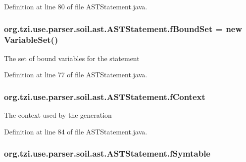 Definition at line 80 of file A\-S\-T\-Statement.\-java.

\hypertarget{classorg_1_1tzi_1_1use_1_1parser_1_1soil_1_1ast_1_1_a_s_t_statement_a9f4ac22b545acfcaf1cd6cb2c22b6ab0}{
\subsubsection[{f\-Bound\-Set}]{ org.\-tzi.\-use.\-parser.\-soil.\-ast.\-A\-S\-T\-Statement.\-f\-Bound\-Set = new {\bf Variable\-Set}()\hspace{0.3cm}{\ttfamily [protected]}}}\label{classorg_1_1tzi_1_1use_1_1parser_1_1soil_1_1ast_1_1_a_s_t_statement_a9f4ac22b545acfcaf1cd6cb2c22b6ab0}
The set of bound variables for the statement 

Definition at line 77 of file A\-S\-T\-Statement.\-java.

\hypertarget{classorg_1_1tzi_1_1use_1_1parser_1_1soil_1_1ast_1_1_a_s_t_statement_ae3cdc8377ff063577f83a0a293b816c9}{
\subsubsection[{f\-Context}]{ org.\-tzi.\-use.\-parser.\-soil.\-ast.\-A\-S\-T\-Statement.\-f\-Context\hspace{0.3cm}{\ttfamily [protected]}}}\label{classorg_1_1tzi_1_1use_1_1parser_1_1soil_1_1ast_1_1_a_s_t_statement_ae3cdc8377ff063577f83a0a293b816c9}
The context used by the generation 

Definition at line 84 of file A\-S\-T\-Statement.\-java.

\hypertarget{classorg_1_1tzi_1_1use_1_1parser_1_1soil_1_1ast_1_1_a_s_t_statement_ac5ea093114a0f21061f5105e5d55c631}{
\subsubsection[{f\-Symtable}]{ org.\-tzi.\-use.\-parser.\-soil.\-ast.\-A\-S\-T\-Statement.\-f\-Symtable\hspace{0.3cm}{\ttfamily [protected]}}}\label{classorg_1_1tzi_1_1use_1_1parser_1_1soil_1_1ast_1_1_a_s_t_statement_ac5ea093114a0f21061f5105e5d55c631}


